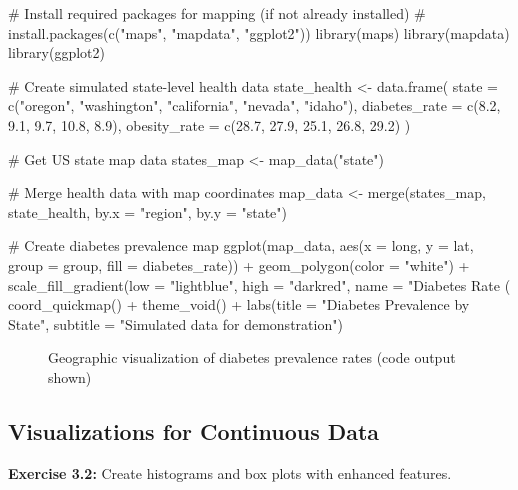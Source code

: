 \documentclass[11pt]{article}
\begin{document}
\begin{rcode}
# Install required packages for mapping (if not already installed)
# install.packages(c("maps", "mapdata", "ggplot2"))
library(maps)
library(mapdata)
library(ggplot2)

# Create simulated state-level health data
state_health <- data.frame(
  state = c("oregon", "washington", "california", "nevada", "idaho"),
  diabetes_rate = c(8.2, 9.1, 9.7, 10.8, 8.9),
  obesity_rate = c(28.7, 27.9, 25.1, 26.8, 29.2)
)

# Get US state map data
states_map <- map_data("state")

# Merge health data with map coordinates
map_data <- merge(states_map, state_health, by.x = "region", by.y = "state")

# Create diabetes prevalence map
ggplot(map_data, aes(x = long, y = lat, group = group, fill = diabetes_rate)) +
  geom_polygon(color = "white") +
  scale_fill_gradient(low = "lightblue", high = "darkred",
                      name = "Diabetes Rate (%
  coord_quickmap() +
  theme_void() +
  labs(title = "Diabetes Prevalence by State",
       subtitle = "Simulated data for demonstration")
\end{rcode}

\begin{figure}[H]
\centering
{}
\caption{Geographic visualization of diabetes prevalence rates (code output shown)}
\end{figure}

\subsection{Visualizations for Continuous Data}

\textbf{Exercise 3.2:} Create histograms and box plots with enhanced features.

\end{document}
